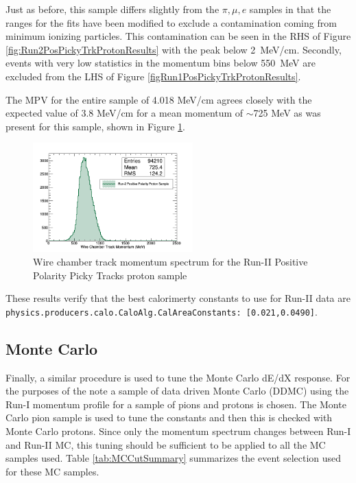 Just as before, this sample differs slightly from the $\pi, \mu, e$ samples in that the ranges for the fits have been modified to exclude a contamination coming from minimum ionizing particles. This contamination can be seen in the RHS of Figure \ref{fig:Run2PosPickyTrkProtonResults} with the peak below 2~MeV/cm. Secondly, events with very low statistics in the momentum bins below 550~MeV are excluded from the LHS of Figure \ref{figRun1PosPickyTrkProtonResults}.

The MPV for the entire sample of 4.018 MeV/cm agrees closely with the expected value of 3.8 MeV/cm for a mean momentum of $\sim$725  MeV as was present for this sample, shown in Figure \ref{fig:Run1PosPickyTrkProtonMomentumSpec}.

\begin{figure}[htb]
\centering
\includegraphics[width=0.55\textwidth]{images/WCTrkMomentumRun2PosProton.png}
\caption{Wire chamber track momentum spectrum for the Run-II Positive Polarity Picky Tracks proton sample  }
\label{fig:Run1PosPickyTrkProtonMomentumSpec}
\end{figure}

These results verify that the best calorimerty constants to use for Run-II data are \verb!physics.producers.calo.CaloAlg.CalAreaConstants: [0.021,0.0490]!.


\subsection{Monte Carlo}\label{sec:MCResults}

Finally, a similar procedure is used to tune the Monte Carlo dE/dX response. For the purposes of the note a sample of data driven Monte Carlo (DDMC) using the Run-I momentum profile  for a sample of pions and protons is chosen. The Monte Carlo pion sample is used to tune the constants and then this is checked with Monte Carlo protons. Since only the momentum spectrum changes between Run-I and Run-II MC, this tuning should be sufficient to be applied to all the MC samples used. Table \ref{tab:MCCutSummary} summarizes the event selection used for these MC samples.

